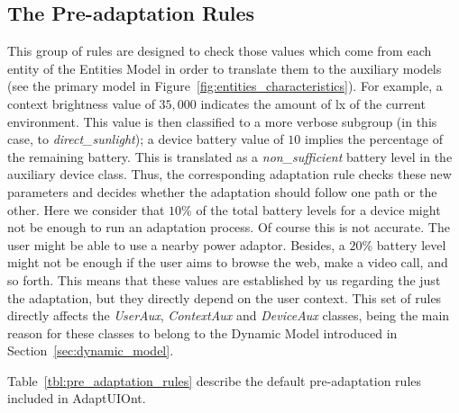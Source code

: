 \subsection{The Pre-adaptation Rules}
This group of rules are designed to check those values which come from each entity 
of the Entities Model in order to translate them to the auxiliary models (see 
the primary model in Figure~\ref{fig:entities_characteristics}). For example, a 
context brightness value of $35,000$ indicates the amount of \ac{lx} of the 
current environment. This value is then classified to a more verbose subgroup 
(in this case, to \textit{direct\_sunlight}); a device battery value of $10$ 
implies the percentage of the remaining battery. This is translated as a 
\textit{non\_sufficient} battery level in the auxiliary device class. Thus,
the corresponding adaptation rule checks these new parameters and decides whether
the adaptation should follow one path or the other. Here we consider that $10$\%
of the total battery levels for a device might not be enough to run an adaptation
process. Of course this is not accurate. The user might be able to use a nearby 
power adaptor. Besides, a $20$\% battery level might not be enough if the user 
aims to browse the web, make a video call, and so forth. This means that these 
values are established by us regarding the just the adaptation, but they directly 
depend on the user context. This set of rules directly affects the 
\textit{UserAux}, \textit{ContextAux} and \textit{DeviceAux} classes, being the 
main reason for these classes to belong to the Dynamic Model introduced in 
Section~\ref{sec:dynamic_model}.

Table~\ref{tbl:pre_adaptation_rules} describe the default pre-adaptation rules
included in AdaptUIOnt.

